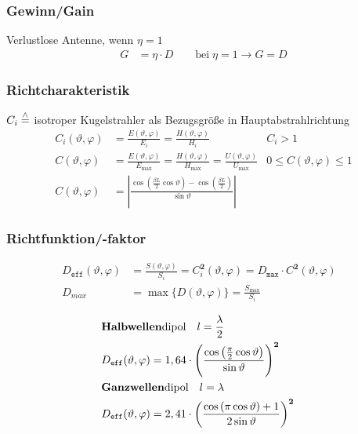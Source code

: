 \subsubsection{Gewinn/Gain}
Verlustlose Antenne, wenn $ \eta = 1 $
\begin{align*}
	G & = \eta \cdot D \qquad \text{bei}\;  \eta=1 \rightarrow  G=D
\end{align*}

\subsubsection{Richtcharakteristik}
$C_{i} \stackrel{\wedge}{=}$ isotroper Kugelstrahler als Bezugsgröße in Hauptabstrahlrichtung
\begin{align*}
	C_{i}(\vartheta, \varphi) & = \frac{E(\vartheta, \varphi)}{E_{i}}=\frac{H(\vartheta, \varphi)}{H_{i}}                                               & C_{i}>1                             \\
	C(\vartheta, \varphi)     & = \frac{E(\vartheta, \varphi)}{E_{\max}}=\frac{H(\vartheta, \varphi)}{H_{\max}} = \frac{U(\vartheta,\varphi)}{U_{\max}} & 0 \leq C(\vartheta, \varphi) \leq 1 \\
	C(\vartheta, \varphi)     & =
	\left|\frac{\cos\left(\frac{\beta L}{2}\cos\vartheta\right)-\cos\left(\frac{\beta L}{2}\right)}{\sin\vartheta}\right|
\end{align*}

\subsubsection{Richtfunktion/-faktor}
\begin{align*}
	D_{\texttt{eff}}(\vartheta, \varphi) & = \frac{S(\vartheta, \varphi)}{S_{i}} = C^\mathbf{2}_i(\vartheta, \varphi) = D_{\texttt{max}} \cdot C^\mathbf{2}(\vartheta, \varphi) & \\
	D_{max}                              & = \max \{D(\vartheta, \varphi)\} = \frac{S_{\max}}{S_{i}}                                                                            &
\end{align*}

\vspace{-0.5cm}
\begin{align*}
	                                                                                          & \text{\textbf{Halbwellen}dipol}\quad l=\frac{\lambda}{2} \\
	                                                                                          & D_{\texttt{eff}}(\vartheta, \varphi) = 1,64 \cdot
	\left(\frac{\cos\left(\frac{\pi}{2}\cos\vartheta\right)}{\sin\vartheta}\right)^\mathbf{2} &                                                          \\
	                                                                                          & \text{\textbf{Ganzwellen}dipol}\quad l=\lambda           \\ &D_{\texttt{eff}}(\vartheta, \varphi) = 2,41 \cdot
	\left(\frac{\cos\left(\pi\cos\vartheta\right)+1}{2\sin\vartheta}\right)^\mathbf{2}        &
\end{align*}

